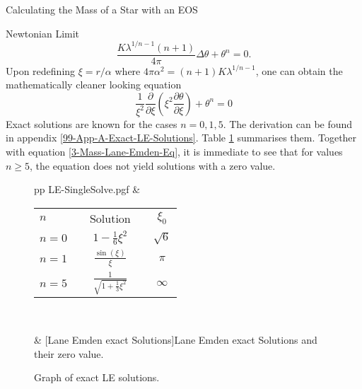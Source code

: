 \begin{section}{Calculating the Mass of a Star with an EOS}
\begin{subsection}{Newtonian Limit}
\begin{equation}
\end{equation}
\begin{equation}
	\frac{K\lambda^{1/n-1}(n+1)}{4\pi}\Delta\theta+\theta^n=0.
\end{equation}
Upon redefining $\xi=r/\alpha$ where $4\pi\alpha^2=(n+1)K\lambda^{1/n-1}$, one can obtain the mathematically cleaner looking equation
\begin{equation}
	\frac{1}{\xi^2}\frac{\partial}{\partial\xi}\left(\xi^2\frac{\partial\theta}{\partial\xi}\right) + \theta^n=0 \label{3-Mass-Lane-Emden-Eq}
\end{equation}
Exact solutions are known for the cases $n=0,1,5$. The derivation can be found in appendix \ref{99-App-A-Exact-LE-Solutions}. Table \ref{3-Mass-LE-Exact-Results} summarises them. Together with equation \ref{3-Mass-Lane-Emden-Eq}, it is immediate to see that for values $n\geq5$, the equation does not yield solutions with a zero value.
\begin{figure}[H]
	\centering
	\begin{tabular}{p{\dimexpr 8cm}p{\dimexpr {}\tabcolsep-8cm}}
		{LE-SingleSolve.pgf}
		&
		\renewcommand{\arraystretch}{1.2}
		\begin{tabular}[b]{@{}lcccc@{}}
			\toprule
			$n$ & \phantom{abcd} & Solution & \phantom{abcd} & $\xi_0$\\
			\cmidrule{1-5}
			$n=0$ && $\displaystyle 1-\frac{1}{6}\xi^2$ && $\sqrt{6}$\\[3ex]
			$n=1$ && $\displaystyle \frac{\sin(\xi)}{\xi}$ && $\pi$\\[3ex]
			$n=5$ && $\displaystyle \frac{1}{\sqrt{1+\frac{1}{3}\xi^2}}$ && $\infty$\\[2ex]
			\bottomrule
		\end{tabular}\\
		\caption[Lane Emden exact Solutions]{Graph of exact LE solutions.}
		\label{3-Mass-LE-Exact-Results-Plots}
		&
		[Lane Emden exact Solutions]{Lane Emden exact Solutions and their zero value.}
		\label{3-Mass-LE-Exact-Results}
	\end{tabular}
\end{figure}


\end{subsection}
\end{section}
